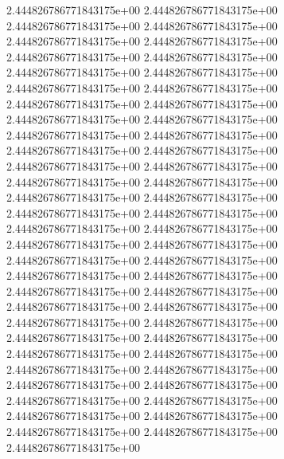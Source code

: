 2.444826786771843175e+00	2.444826786771843175e+00	2.444826786771843175e+00	2.444826786771843175e+00	2.444826786771843175e+00	2.444826786771843175e+00	2.444826786771843175e+00	2.444826786771843175e+00	2.444826786771843175e+00	2.444826786771843175e+00	2.444826786771843175e+00	2.444826786771843175e+00	2.444826786771843175e+00	2.444826786771843175e+00	2.444826786771843175e+00	2.444826786771843175e+00	2.444826786771843175e+00	2.444826786771843175e+00	2.444826786771843175e+00	2.444826786771843175e+00	2.444826786771843175e+00	2.444826786771843175e+00	2.444826786771843175e+00	2.444826786771843175e+00	2.444826786771843175e+00	2.444826786771843175e+00	2.444826786771843175e+00	2.444826786771843175e+00	2.444826786771843175e+00	2.444826786771843175e+00	2.444826786771843175e+00	2.444826786771843175e+00	2.444826786771843175e+00	2.444826786771843175e+00	2.444826786771843175e+00	2.444826786771843175e+00	2.444826786771843175e+00	2.444826786771843175e+00	2.444826786771843175e+00	2.444826786771843175e+00	2.444826786771843175e+00	2.444826786771843175e+00	2.444826786771843175e+00	2.444826786771843175e+00	2.444826786771843175e+00	2.444826786771843175e+00	2.444826786771843175e+00	2.444826786771843175e+00	2.444826786771843175e+00	2.444826786771843175e+00	2.444826786771843175e+00	2.444826786771843175e+00	2.444826786771843175e+00	2.444826786771843175e+00	2.444826786771843175e+00	2.444826786771843175e+00	2.444826786771843175e+00
